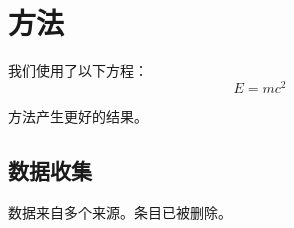 \section{方法}
\label{sec:method}

我们使用了以下方程：
\begin{equation}
    E = mc^2
    \label{eq:energy}
\end{equation}

方法产生更好的结果。

\subsection{数据收集}
数据来自多个来源。条目已被删除。